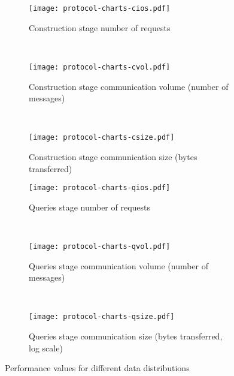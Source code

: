 \newlength{\hardcodedheight}
\newlength{\askip}
\newlength{\bskip}
\newlength{\blskip}

\setlength{\hardcodedheight}{135pt}
\setlength{\askip}{-10pt}
\setlength{\bskip}{0pt}
\setlength{\blskip}{-5pt}

\begin{figure*}[ht!]
	\captionsetup[subfigure]{justification=centering}
	\centering
	\begin{subfigure}[t]{0.333\textwidth}
		\centering
		\texttt{[image: protocol-charts-cios.pdf]}
		\setlength{\abovecaptionskip}{\askip}
		\setlength{\belowcaptionskip}{\bskip}
		\caption{Construction stage number of {\IO} requests}\label{figure:protocols:cios}
	\end{subfigure}%
	~ %
	\begin{subfigure}[t]{0.333\textwidth}
		\centering
		\texttt{[image: protocol-charts-cvol.pdf]}
		\setlength{\abovecaptionskip}{\askip}
		\setlength{\belowcaptionskip}{\bskip}
		\caption{Construction stage communication volume (number of messages)}\label{figure:protocols:cvol}
	\end{subfigure}%
	~ %
	\begin{subfigure}[t]{0.333\textwidth}
		\centering
		\texttt{[image: protocol-charts-csize.pdf]}
		\setlength{\abovecaptionskip}{\askip}
		\setlength{\belowcaptionskip}{\bskip}
		\caption{Construction stage communication size (bytes transferred)}\label{figure:protocols:csize}
	\end{subfigure}%

	\begin{subfigure}[t]{0.333\textwidth}
		\centering
		\texttt{[image: protocol-charts-qios.pdf]}
		\setlength{\abovecaptionskip}{\askip}
		\setlength{\belowcaptionskip}{\blskip}
		\caption{Queries stage number of {\IO} requests}\label{figure:protocols:qios}
	\end{subfigure}%
	~ %
	\begin{subfigure}[t]{0.333\textwidth}
		\centering
		\texttt{[image: protocol-charts-qvol.pdf]}
		\setlength{\abovecaptionskip}{\askip}
		\setlength{\belowcaptionskip}{\blskip}
		\caption{Queries stage communication volume (number of messages)}\label{figure:protocols:qvol}
	\end{subfigure}%
	~ %
	\begin{subfigure}[t]{0.333\textwidth}
		\centering
		\texttt{[image: protocol-charts-qsize.pdf]}
		\setlength{\abovecaptionskip}{\askip}
		\setlength{\belowcaptionskip}{\blskip}
		\caption{Queries stage communication size (bytes transferred, log scale)}\label{figure:protocols:qsize}
	\end{subfigure}%
	\caption{Performance values for different data distributions}\label{figure:protocols}
\end{figure*}
